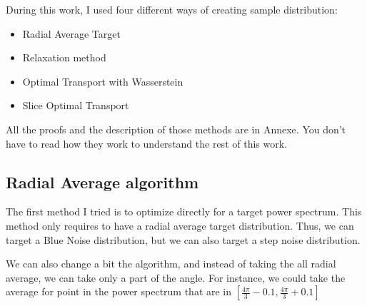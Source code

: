 \documentclass{classeENS}
\begin{document}
During this work, I used four different ways of creating sample distribution:
\begin{itemize}
    \item Radial Average Target
    \item Relaxation method
    \item Optimal Transport with Wasserstein
    \item Slice Optimal Transport 
\end{itemize}
All the proofs and the description of those methods are in Annexe. 
You don't have to read how they work to understand the rest of this work.

\subsection{Radial Average algorithm}
    The first method I tried is to optimize directly for a target power spectrum.
    This method only requires to have a radial average target distribution. Thus, we can
    target a Blue Noise distribution, but we can also target a step noise distribution.
    
    We can also change a bit the algorithm, and instead of taking the all radial average,
    we can take only a part of the angle. For instance, we could take the average for
    point in the power spectrum that are in $[\frac{4\pi}{3} - 0.1, \frac{4\pi}{3}+0.1]$
    
\end{document}

